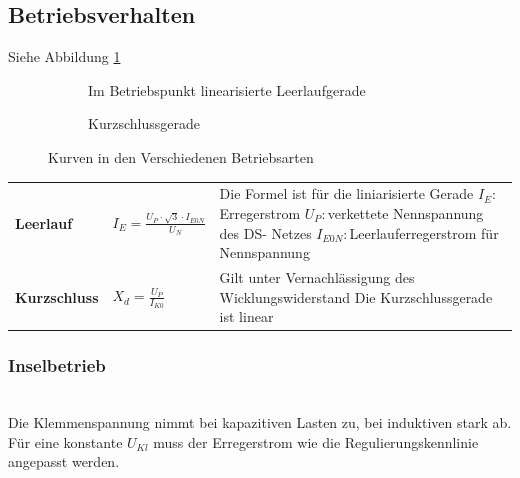     \subsection{Betriebsverhalten}
    	Siehe Abbildung \ref{fig:betriebsverhalten}
    	\begin{figure}[h!]
	    	\centering
	    	\begin{subfigure}[t]{0.45\textwidth}
	    		\centering
	    		\caption{Im Betriebspunkt linearisierte Leerlaufgerade}
	    	\end{subfigure}
	    	\begin{subfigure}[t]{0.45\textwidth}
	    		\centering
	    		\caption{Kurzschlussgerade}
	        \end{subfigure}
	        \caption{Kurven in den Verschiedenen Betriebsarten}
	        \label{fig:betriebsverhalten}
    	\end{figure}
    	
    	\begin{tabular}{ l l p{9cm} }
    		\textbf{Leerlauf}
    		& $I_E = \frac{U_P \cdot \sqrt{3} \cdot I_{E0N}}{U_N}$ 
    		& Die Formel ist für die liniarisierte Gerade \newline
    		  $I_E: $Erregerstrom \newline
    		  $U_P: $verkettete Nennspannung des DS- Netzes\newline
    		  $I_{E0N}:$Leerlauferregerstrom für Nennspannung
    		\\
    		\textbf{Kurzschluss} 
    		& $X_d=\frac{U_P}{I_{K0}}$
    		& Gilt unter Vernachlässigung des Wicklungswiderstand \newline
    		  Die Kurzschlussgerade ist linear
    		\\
    	\end{tabular} 
    	

    \subsubsection{Inselbetrieb}
        \begin{minipage}{10cm}
        \end{minipage}
        \begin{minipage}{6cm}
        \end{minipage} \\
        Die Klemmenspannung nimmt bei kapazitiven Lasten zu, bei induktiven stark ab. Für eine konstante $U_{Kl}$ muss der Erregerstrom wie die Regulierungskennlinie angepasst werden.


